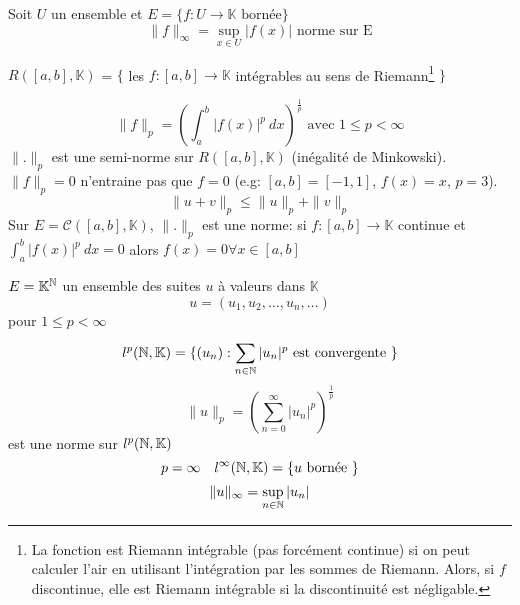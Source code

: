 \begin{definition}
    Soit $U$ un ensemble et $E = \{f: U \to \mathbb{K} \text{ bornée} \}$ 
    \[
        \|f\|_{\infty} = \sup_{x \in U} |f(x)| \text{ norme sur E}
    \] 
\end{definition}
\begin{definition}
    $R([a, b], \mathbb{K})$ = $\{$ les  $f: [a, b] \to \mathbb{K}$ intégrables au sens de Riemann\footnote{La fonction est Riemann intégrable (pas forcément continue) si on peut calculer l'air en utilisant l'intégration par les sommes de Riemann. Alors, si $f$ discontinue, elle est Riemann intégrable si la discontinuité est négligable.} $\}$
\end{definition}

\begin{eg}
    \[
        \|f\|_{p} = \left( \int_{{a}}^{{b}} {|f(x)|^{p}} \: d{x} {} \right)^{\frac{1}{p}} \text{ avec } 1 \le p < \infty
    \] 
    $\| . \|_{p}$ est une semi-norme sur $R([a, b], \mathbb{K})$ (inégalité de Minkowski). $\|f\|_{p} = 0$ n'entraine pas que $f = 0$ (e.g: $[a, b] = [-1, 1]$,  $f(x) = x$, $p = 3$). 
    \[
        \|u + v\|_{p} \le \|u\|_p + \|v\|_p
    \] 
    Sur $E = \mathcal{C}([a, b], \mathbb{K})$,  $\| . \|_{p}$ est une norme:
    si $f: [a, b] \to \mathbb{K}$ continue et $\int_{{a}}^{{b}} {|f(x)|^p} \: d{x} = 0$ alors $f(x) = 0 \forall x \in [a, b]$
\end{eg}

\begin{eg}
    $E = \mathbb{K}^{\mathbb{N}}$ un ensemble des suites $u$ à valeurs dans  $\mathbb{K}$ 
    \[
    u = (u_1, u_2, \ldots, u_n, \ldots )
    \] 
    pour $1 \le p < \infty$
    \[
        l^{p}(\mathbb{N}, \mathbb{K}) = \{(u_n): \sum_{n \in \mathbb{N}}^{} |u_n|^{p} \text{ est convergente } \}
    \] 
    \[
        \|u\|_p = \left( \sum_{n=0}^{\infty} |u_n|^{p} \right)^{\frac{1}{p}}
    \] 
    est une norme sur $l^{p}(\mathbb{N}, \mathbb{K})$
    \[
        p = \infty \quad l^{\infty}(\mathbb{N}, \mathbb{K}) = \{u \text{ bornée } \}
    \] 
    \[
        \|u\|_{\infty} = \sup_{n \in \mathbb{N}} |u_n|
    \] 
\end{eg}
